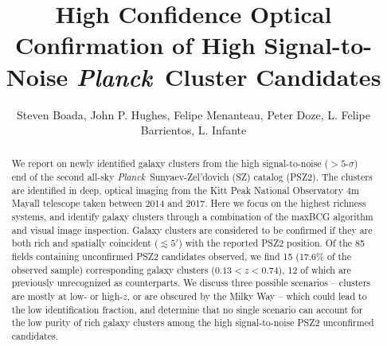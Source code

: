 \documentclass[apj, revtex4-1]{emulateapj}
\newcommand{\planck}{\textit{Planck}}
\begin{document}
\title{High Confidence Optical Confirmation of High Signal-to-Noise \planck\ Cluster Candidates}

\author{\sc Steven Boada,
John P. Hughes,
Felipe Menanteau,
Peter Doze,
L. Felipe Barrientos,
L. Infante
}



\begin{abstract}
\noindent We report on newly identified galaxy clusters from the high signal-to-noise ($>5$-$\sigma$) end of the second all-sky \planck\ Sunyaev-Zel'dovich (SZ) catalog (PSZ2). The clusters are identified in deep, optical imaging from the Kitt Peak National Observatory 4m Mayall telescope taken between 2014 and 2017. Here we focus on the highest richness systems, and identify galaxy clusters through a combination of the maxBCG algorithm and visual image inspection. Galaxy clusters are considered to be confirmed if they are both rich and spatially coincident ($\lesssim 5'$) with the reported PSZ2 position. Of the 85 fields containing unconfirmed PSZ2 candidates observed, we find 15 (17.6\% of the observed sample) corresponding galaxy clusters ($ 0.13 < z < 0.74$), 12 of which are previously unrecognized as counterparts. We discuss three possible scenarios -- clusters are mostly at low- or high-$z$, or are obscured by the Milky Way -- which could lead to the low identification fraction, and determine that no single scenario can account for the low purity of rich galaxy clusters among the high signal-to-noise PSZ2 unconfirmed candidates.
\end{abstract}
\end{document}
